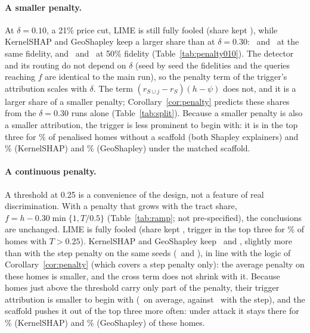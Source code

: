 \paragraph{A smaller penalty.} At $\delta = 0.10$, a 21\% price cut, LIME is still fully fooled (share kept
\PenTenLIMEKept), while KernelSHAP and GeoShapley keep a larger share than at $\delta = 0.30$: \PenTenKernelSHAPKept\
and \PenTenGeoShapleyKept\ at the same fidelity, and \PenTenKernelSHAPFiftyKept\ and \PenTenGeoShapleyFiftyKept\ at
50\% fidelity (Table~\ref{tab:penalty010}). The detector and its routing do not depend on $\delta$ (seed by seed the
fidelities and the queries reaching $f$ are identical to the main run), so the penalty term of the trigger's
attribution scales with $\delta$. The term $(r_{S\cup j} - r_S)(h - \psi)$ does not, and it is a larger share of a
smaller penalty; Corollary~\ref{cor:penalty} predicts these shares from the $\delta = 0.30$ runs alone
(Table~\ref{tab:split}). Because a smaller penalty is also a smaller attribution, the trigger is less prominent to begin with:
it is in the top three for \PenTenKernelSHAPBiasedTopPen\% of penalised homes without a scaffold (both Shapley
explainers) and
\PenTenKernelSHAPTopPen\% (KernelSHAP) and \PenTenGeoShapleyTopPen\% (GeoShapley) under the matched scaffold.
\tabinput{tab_penalty010}

\paragraph{A continuous penalty.} A threshold at 0.25 is a convenience of the design, not a feature of real
discrimination. With a penalty that grows with the tract share, $f = h - 0.30\min\{1, T/0.5\}$ (Table~\ref{tab:ramp};
not pre-specified), the conclusions are unchanged. LIME is fully fooled (share kept \RampLIMEMatKept, trigger in the
top three for \RampLIMEMatTopPen\% of homes with $T > 0.25$). KernelSHAP and GeoShapley keep \RampKernelSHAPMatKept\
and \RampGeoShapleyMatKept, slightly more than with the step penalty on the same seeds (\MainKernelSHAPKeptLocalTab\
and \MainGeoShapleyKeptLocalTab), in line with the logic of Corollary~\ref{cor:penalty} (which covers a step penalty
only): the average penalty on these homes is smaller, and the cross term does not shrink with it. Because homes just above the threshold carry only part
of the penalty, their trigger attribution is smaller to begin with (\RampKernelSHAPBiasedSigned\ on average, against
\MainKernelSHAPBiasedSignedLocalTab\ with the step), and the scaffold pushes it out of the top three more often:
under attack it stays there for \RampKernelSHAPMatTopPen\% (KernelSHAP) and \RampGeoShapleyMatTopPen\% (GeoShapley)
of these homes.
\tabinput{tab_ramp}

